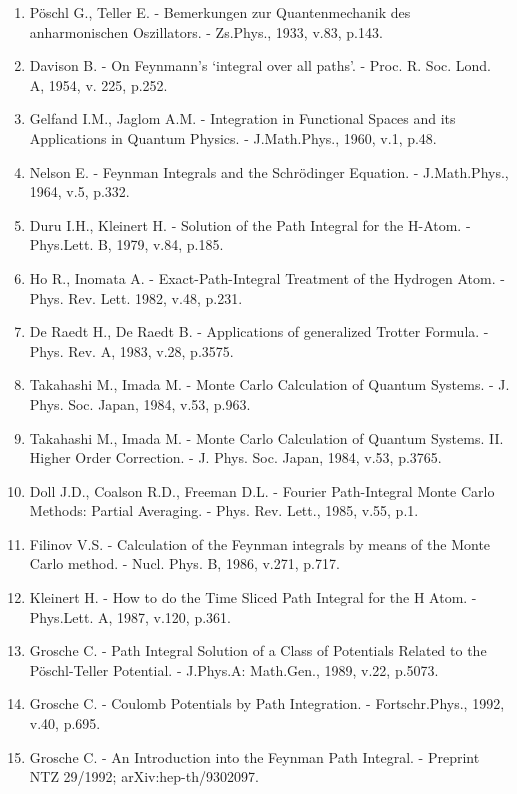 \documentclass[11pt]{article}
\begin{document}
{\renewcommand{\labelenumi}{\alph{enumi}.}
\begin{enumerate}
\item P\"oschl G., Teller E. - Bemerkungen zur Quantenmechanik des anharmonischen Oszillators. - Zs.Phys., 1933, v.83, p.143.
\item Davison B. - On Feynmann's `integral over all paths'.
	- Proc. R. Soc. Lond. A, 1954, v. 225, p.252.
\item Gelfand I.M., Jaglom A.M. -  
	Integration in Functional Spaces and its
	Applications in Quantum Physics. - J.Math.Phys., 1960, v.1, p.48.
\item Nelson E. - Feynman Integrals and the Schr\"odinger Equation. - 
            J.Math.Phys., 1964, v.5,  p.332.
\item Duru I.H., Kleinert H. - Solution of the Path Integral for the H-Atom. -
	Phys.Lett. B, 1979,  v.84, p.185.
\item Ho  R., Inomata A. - 
        Exact-Path-Integral Treatment of the Hydrogen Atom. - Phys. Rev. Lett.  1982, v.48, p.231.
\item De Raedt H., De Raedt B. - Applications of generalized Trotter Formula.
	- Phys. Rev. A, 1983, v.28, p.3575.
\item Takahashi M., Imada M. - Monte Carlo Calculation of Quantum Systems. -
	J. Phys. Soc. Japan, 1984, v.53,  p.963. %
\item Takahashi M., Imada M. - Monte Carlo Calculation of Quantum Systems. 
        II. Higher Order Correction. -
	J. Phys. Soc. Japan, 1984, v.53,  p.3765. %
\item Doll J.D., Coalson R.D., Freeman D.L. - Fourier Path-Integral Monte Carlo
	Methods: Partial Averaging. -  Phys. Rev. Lett., 1985, v.55, p.1.
\item Filinov V.S. -  Calculation of the Feynman integrals by means of the Monte Carlo method. - Nucl. Phys. B, 1986, v.271, p.717. %
\item Kleinert H. - How to do the Time Sliced Path Integral for the H Atom. -
	Phys.Lett. A, 1987, v.120, p.361.
\item Grosche C. - Path Integral Solution of a Class of Potentials Related to the
	P\"oschl-Teller Potential. - J.Phys.A: Math.Gen.,  1989, v.22, p.5073.
\item Grosche  C. - Coulomb Potentials by Path Integration. - Fortschr.Phys., 1992, v.40,
	 p.695.
\item  Grosche C. - An Introduction into the Feynman Path Integral. -
	Preprint NTZ 29/1992; arXiv:hep-th/9302097.

\end{enumerate}}
\end{document}

